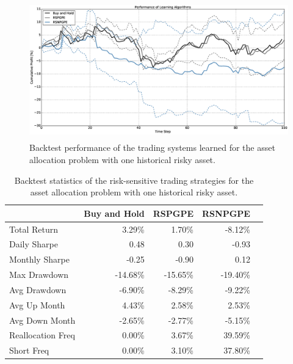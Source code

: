 \begin{figure}[t!]
	\centering
	\includegraphics[height=6cm,width=1.0\textwidth]{Images/8_11_single_hist_sensitive_performance}
	\caption[Backtest performance with one historical risky asset.]{Backtest performance of the trading systems learned for the asset allocation problem with one historical risky asset.}
	\label{fig:8_11_single_hist_sensitive_performance}
\end{figure}

\begin{table}[t!]
\centering
\begin{tabular}{@{}lrrrr@{}}
\toprule
                  & \multicolumn{1}{c}{Buy and Hold} & \multicolumn{1}{c}{RSPGPE} & \multicolumn{1}{c}{RSNPGPE} \\ \midrule
Total Return      & 3.29\%       & 1.70\%   & -8.12\%  \\
Daily Sharpe      & 0.48         & 0.30     & -0.93    \\
Monthly Sharpe    & -0.25        & -0.90    & 0.12     \\
Max Drawdown      & -14.68\%     & -15.65\% & -19.40\% \\
Avg Drawdown      & -6.90\%      & -8.29\%  & -9.22\%  \\
Avg Up Month      & 4.43\%       & 2.58\%   & 2.53\%   \\
Avg Down Month    & -2.65\%      & -2.77\%  & -5.15\%  \\
Reallocation Freq & 0.00\%       & 3.67\%   & 39.59\%  \\
Short Freq        & 0.00\%       & 3.10\%   & 37.80\%  \\ \bottomrule
\end{tabular}
\caption[Backtest statistics for risk-sensitive learning with one historical risky asset.]{Backtest statistics of the risk-sensitive trading strategies for the asset allocation problem with one historical risky asset.}
\label{tab:single_historical_sensitive_performance}
\end{table}
\clearpage





